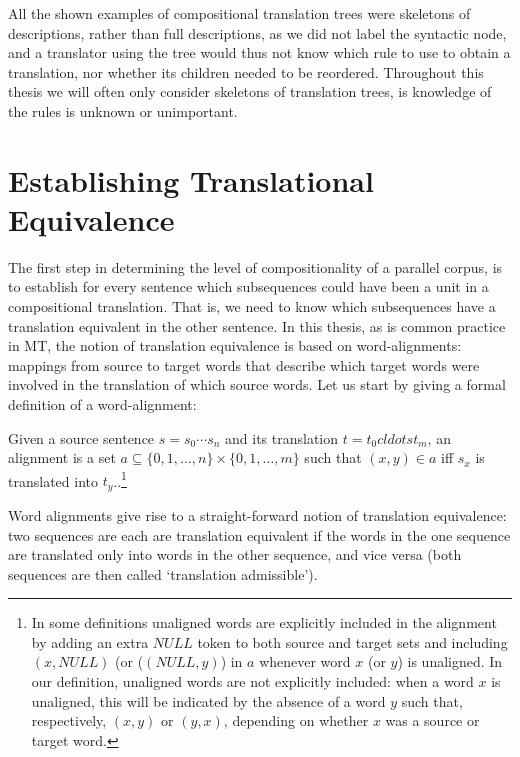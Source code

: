 \documentclass{report}
\begin{document}
All the shown examples of compositional translation trees were skeletons of descriptions, rather than full descriptions, as we did not label the syntactic node, and a translator using the tree would thus not know which rule to use to obtain a translation, nor whether its children needed to be reordered. Throughout this thesis we will often only consider skeletons of translation trees, is knowledge of the rules is unknown or unimportant.


\section{Establishing Translational Equivalence}
\label{sec:trans_eq}

The first step in determining the level of compositionality of a parallel corpus, is to establish for every sentence which subsequences could have been a unit in a compositional translation. That is, we need to know which subsequences have a translation equivalent in the other sentence. In this thesis, as is common practice in MT, the notion of translation equivalence is based on word-alignments: mappings from source to target words that describe which target words were involved in the translation of which source words. Let us start by giving a formal definition of a word-alignment:

\begin{definition}\label{def:alignment}
Given a source sentence $s = s_0 \cdots s_n$ and its translation $t = t_0 cldots t_m$, an alignment is a set $a \subseteq \{0,1,\ldots,n\} \times \{0,1,\ldots,m\}$ such that $(x,y)\in a$ iff $s_x$ is translated into $t_y$..\footnote{In some definitions unaligned words are explicitly included in the alignment by adding an extra $NULL$ token to both source and target sets and including $(x,NULL)$ (or ($(NULL,y)$) in $a$ whenever word $x$ (or $y$) is unaligned. In our definition, unaligned words are not explicitly included: when a word $x$ is unaligned, this will be indicated by the absence of a word $y$ such that, respectively, $(x,y)$ or $(y,x)$, depending on whether $x$ was a source or target word.}
\end{definition}

Word alignments give rise to a straight-forward notion of translation equivalence: two sequences are each are translation equivalent if the words in the one sequence are translated only into words in the other sequence, and vice versa (both sequences are then called `translation admissible'). 
\end{document}

